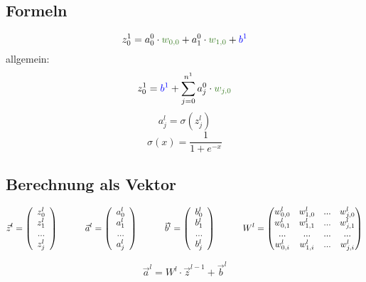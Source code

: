 \documentclass{article}
\begin{document}
\subsection{Formeln}
\[ z_0^1 = a_0^0 \cdot \textcolor{OliveGreen}{w_{0,0}} + a_1^0 \cdot \textcolor{OliveGreen}{w_{1,0}} + \textcolor{blue}{b^1} \]
allgemein:
\[  z_0^1 = \textcolor{blue}{b^1} + \sum_{j=0}^{n^1} a_j^0 \cdot \textcolor{OliveGreen}{w_{j,0}}  \]
\[a_j^l = \sigma(z_j^l)\]
\[\sigma(x) = \frac{1}{1 + e^{-x}}\]


\pagebreak
\subsection{Berechnung als Vektor}
\[ \vec{z}^l = \left(\begin{array}{c} z_0^l \\ z_1^l \\ ... \\ z_j^l \end{array}\right) 
\kern 30pt
\vec{a}^l = \left(\begin{array}{c} a_0^l \\ a_1^l \\ ... \\ a_j^l \end{array}\right) 
\kern 30pt
\vec{b}^l = \left(\begin{array}{c} b_0^l \\ b_1^l \\ ... \\ b_j^l \end{array}\right) 
\kern 30pt
W^l = \begin{pmatrix}
    w_{0,0}^l & w_{1,0}^l & ... & w_{j,0}^l \\
    w_{0,1}^l & w_{1,1}^l & ... & w_{j,1}^l \\
    ... & ... & ... & ... \\
    w_{0,i}^l & w_{1,i}^l & ... & w_{j,i}^l
\end{pmatrix} \]

\[ \vec{a}^l = W^l \cdot \vec{z}^{l-1} + \vec{b}^l \]
\end{document}
